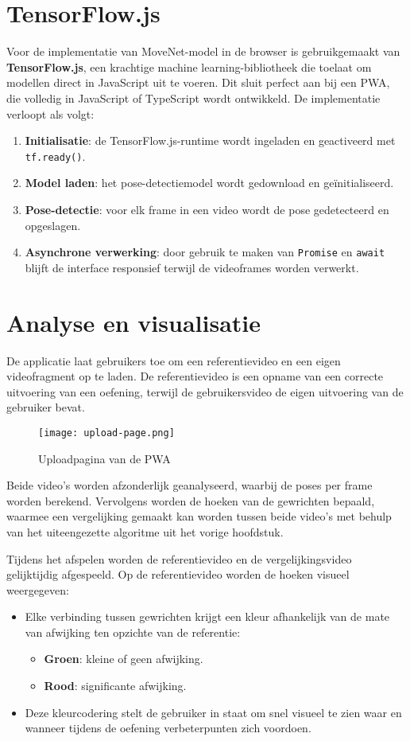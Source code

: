 \section{TensorFlow.js}
Voor de implementatie van MoveNet-model in de browser is gebruikgemaakt van \textbf{TensorFlow.js}, een krachtige machine learning-bibliotheek die toelaat om modellen direct in JavaScript uit te voeren. 
Dit sluit perfect aan bij een PWA, die volledig in JavaScript of TypeScript wordt ontwikkeld.
De implementatie verloopt als volgt:
\begin{enumerate}
    \item \textbf{Initialisatie}: de TensorFlow.js-runtime wordt ingeladen en geactiveerd met \verb|tf.ready()|.
    \item \textbf{Model laden}: het pose-detectiemodel wordt gedownload en geïnitialiseerd.
    \item \textbf{Pose-detectie}: voor elk frame in een video wordt de pose gedetecteerd en opgeslagen.
    \item \textbf{Asynchrone verwerking}: door gebruik te maken van \verb|Promise| en \verb|await| blijft de interface responsief terwijl de videoframes worden verwerkt.
\end{enumerate}

\section{Analyse en visualisatie}
De applicatie laat gebruikers toe om een referentievideo en een eigen videofragment op te laden. 
De referentievideo is een opname van een correcte uitvoering van een oefening, terwijl de gebruikersvideo de eigen uitvoering van de gebruiker bevat.
\begin{figure}
  \centering
  \texttt{[image: upload-page.png]}
  \caption[Upload page]{\label{fig:upload_page}Uploadpagina van de PWA}
\end{figure}

Beide video’s worden afzonderlijk geanalyseerd, waarbij de poses per frame worden berekend. 
Vervolgens worden de hoeken van de gewrichten bepaald, waarmee een vergelijking gemaakt kan worden tussen beide video’s met behulp van het uiteengezette algoritme uit het vorige hoofdstuk.

Tijdens het afspelen worden de referentievideo en de vergelijkingsvideo gelijktijdig afgespeeld. Op de referentievideo worden de hoeken visueel weergegeven:
\begin{itemize}
    \item Elke verbinding tussen gewrichten krijgt een kleur afhankelijk van de mate van afwijking ten opzichte van de referentie:
    \begin{itemize}
        \item \textbf{Groen}: kleine of geen afwijking.
        \item \textbf{Rood}: significante afwijking.
    \end{itemize}
    \item Deze kleurcodering stelt de gebruiker in staat om snel visueel te zien waar en wanneer tijdens de oefening verbeterpunten zich voordoen.
\end{itemize}

